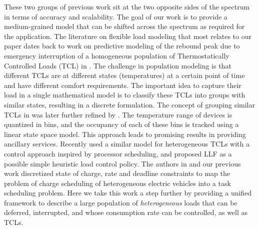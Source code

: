 \documentclass[10pt]{IEEEtran}
\begin{document}
These two groups of previous work sit at the two opposite sides of the spectrum in terms of accuracy and scalability. The goal of our work is to provide a medium-grained model that can be shifted across the spectrum as required for the application. The literature on flexible load modeling that most relates to our  paper dates back to  work on predictive modeling of the rebound peak due to emergency interruption of  a homogeneous population of Thermostatically Controlled Loads (TCL) in \cite{Chong}.  The challenge in population modeling is that different TCLs are at different states (temperatures) at a certain point of time and have different comfort requirements. The important idea to capture their load in a single mathematical model is to  classify these TCLs into
groups with similar states, resulting in a discrete formulation.
The concept of grouping similar TCLs  in \cite{Chong} was  later further refined by \cite{lu-chassin04,lu-chassin-windegren05, koch2011modeling}.  The temperature range of devices is quantized in bins, and the occupancy of each of these bins is tracked using a linear state space model. This approach leads to promising results in providing ancillary services. Recently \cite{hao2013generalized, globalSIP} used a similar model for heterogeneous TCLs with a control approach inspired by processor scheduling, and proposed LLF as a possible simple heuristic load control policy.   The authors in \cite{6407491} and our previous work \cite{smartgridcomm} discretized state of charge, rate and deadline constraints to map the problem of charge scheduling of heterogeneous electric vehicles  into a task scheduling problem.  Here we take this work a step further by providing a unified framework to describe a large population of {\it heterogeneous} loads that can be deferred, interrupted, and whose consumption rate can be controlled, as well as TCLs.
\end{document}
